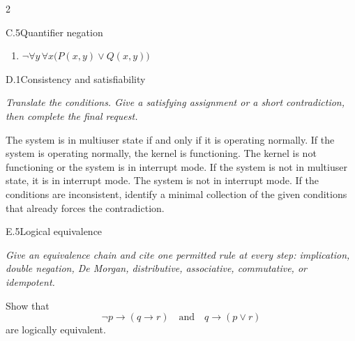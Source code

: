 \documentclass[9pt]{extarticle}
\begin{document}
\begin{multicols}{2}
\begin{CoreProblem}{C.5}{Quantifier negation}
\begin{enumerate}[label=(\alph*)]
  \item $\neg\forall y\,\forall x\bigl(P(x,y)\lor Q(x,y)\bigr)$
\end{enumerate}
\end{CoreProblem}
\columnbreak
\begin{CoreProblem}{D.1}{Consistency and satisfiability}
{\scriptsize\textit{Translate the conditions. Give a satisfying assignment or a short contradiction, then complete the final request.}\par}
The system is in multiuser state if and only if it is operating normally. If
the system is operating normally, the kernel is functioning. The kernel is not
functioning or the system is in interrupt mode. If the system is not in
multiuser state, it is in interrupt mode. The system is not in interrupt mode.
If the conditions are inconsistent, identify a minimal collection of the given
conditions that already forces the contradiction.
\end{CoreProblem}
\begin{CoreProblem}{E.5}{Logical equivalence}
{\scriptsize\textit{Give an equivalence chain and cite one permitted rule at every step: implication, double negation, De Morgan, distributive, associative, commutative, or idempotent.}\par}
Show that
\[
  \neg p\to(q\to r)
  \quad\text{and}\quad
  q\to(p\lor r)
\]
are logically equivalent.
\end{CoreProblem}
\end{multicols}
\CoreWorkArea
\FormBreak
{}
\end{document}

